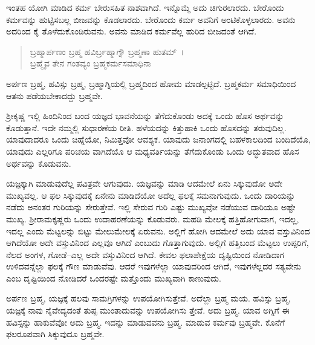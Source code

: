 ಇಂತಹ ಯೋಗಿ ಮಾಡಿದ ಕರ್ಮ ಬೇರುಸಹಿತ ನಾಶವಾಗಿದೆ. ಇನ್ನೊಮ್ಮೆ ಅದು ಚಿಗುರಲಾರದು. ಬೇರೊಂದು ಕರ್ಮವನ್ನು ಹುಟ್ಟಿಸಬಲ್ಲ ಬೀಜವನ್ನು ಕೊಡಲಾರದು. ಬೇರೊಂದು ಕರ್ಮ ಅವನಿಗೆ ಅಂಟಿಕೊಳ್ಳಲಾರದು. ಅವನು ಅದರಿಂದ ಕೈ ತೊಳೆದುಕೊಂಡಿರುವನು. ಅವನು ಮಾಡಿದ ಕರ್ಮವೆಲ್ಲ ಹುರಿದ ಬೀಜದಂತೆ ಆಗಿದೆ.

\begin{verse}
ಬ್ರಹ್ಮಾರ್ಪಣಂ ಬ್ರಹ್ಮ ಹವಿರ್ಬ್ರಹ್ಮಾಗ್ನೌ ಬ್ರಹ್ಮಣಾ ಹುತಮ್~।\\ಬ್ರಹ್ಮೈವ ತೇನ ಗಂತವ್ಯಂ ಬ್ರಹ್ಮಕರ್ಮಸಮಾಧಿನಾ 
\end{verse}

{\small ಅರ್ಪಣ ಬ್ರಹ್ಮ, ಹವಿಸ್ಸು ಬ್ರಹ್ಮ, ಬ್ರಹ್ಮಾಗ್ನಿಯಲ್ಲಿ ಬ್ರಹ್ಮದಿಂದ ಹೋಮ ಮಾಡಲ್ಪಟ್ಟಿದೆ. ಬ್ರಹ್ಮಕರ್ಮ ಸಮಾಧಿಯಿಂದ ಆತನು ಪಡೆಯಬೇಕಾದದ್ದು ಬ್ರಹ್ಮವೇ.}

ಶ‍್ರೀಕೃಷ್ಣ ಇಲ್ಲಿ ಹಿಂದಿನಿಂದ ಬಂದ ಯಜ್ಞದ ಭಾವನೆಯನ್ನು ತೆಗೆದುಕೊಂಡು ಅದಕ್ಕೆ ಒಂದು ಹೊಸ ಅರ್ಥವನ್ನು ಕೊಡುತ್ತಾನೆ. ಇದೇ ನಮ್ಮಲ್ಲಿ ಸುಧಾರಣೆಯ ರೀತಿ. ಹಳೆಯದನ್ನು ಕಿತ್ತುಹಾಕಿ ಒಂದು ಹೊಸದನ್ನು ತರುವುದಿಲ್ಲ. ಯಾವುದಾದರೂ ಒಂದು ಚಿಹ್ನೆಯೋ, ನಿಮಿತ್ತವೋ ಆವಶ್ಯಕ. ಯಾವುದು ಜನಾಂಗದಲ್ಲಿ ಬಹಳಕಾಲದಿಂದ ಬಂದಿದೆಯೊ, ಯಾವುದು ಎಲ್ಲರಿಗೂ ಪರಿಚಯ ವಾಗಿದೆಯೊ ಆ ಮಧ್ಯವರ್ತಿಯನ್ನು ತೆಗೆದುಕೊಂಡು ಒಂದು ಅದ್ಭುತವಾದ ಹೊಸ ಅರ್ಥವನ್ನು ಕೊಡುವನು.

ಯಜ್ಞಕ್ಕಾಗಿ ಮಾಡುವುದೆಲ್ಲ ಪವಿತ್ರವೇ ಆಗುವುದು. ಯಜ್ಞವನ್ನು ಮಾಡಿ ಆದಮೇಲೆ ಏನು ಸಿಕ್ಕುವುದೋ ಅದೇ ಮುಖ್ಯವಲ್ಲ. ಆ ಫಲ ಸಿಕ್ಕುವುದಕ್ಕೆ ಏನೇನು ಮಾಡಿದೆಯೋ ಅದೆಲ್ಲ ಫಲಕ್ಕೆ ಸಮನಾಗುವುದು. ಒಂದು ದಾರಿಯನ್ನು ನಡೆದು ಅನಂತರ ಗುರಿಯನ್ನು ಸೇರುತ್ತೇವೆ. ಇಲ್ಲಿ ಸೇರುವ ಗುರಿ ಎಷ್ಟು ಮುಖ್ಯವೋ ನಡೆಯುವ ದಾರಿಯೂ ಅಷ್ಟೇ ಮುಖ್ಯ. ಶ‍್ರೀರಾಮಕೃಷ್ಣರು ಒಂದು ಉದಾಹರಣೆಯನ್ನು ಕೊಡುವರು. ಮಹಡಿ ಮೇಲಕ್ಕೆ ಹತ್ತಿಹೋಗುವಾಗ, ಇದಲ್ಲ, ಇದಲ್ಲ ಎಂದು ಮೆಟ್ಟಲನ್ನು ಬಿಟ್ಟು ಮೇಲುಮೇಲಕ್ಕೆ ಏರುವನು. ಅಲ್ಲಿಗೆ ಹೋಗಿ ಆದಮೇಲೆ ಅದು ಯಾವ ವಸ್ತುವಿನಿಂದ ಆಗಿದೆಯೋ ಅದೇ ವಸ್ತುವಿನಿಂದ ಎಲ್ಲವೂ ಆಗಿದೆ ಎಂಬುದು ಗೊತ್ತಾಗುವುದು. ಅಲ್ಲಿಗೆ ಹತ್ತಿಬಂದ ಮೆಟ್ಟಲು ಉಪ್ಪರಿಗೆ, ನೆಲದ ಅಂಗಳ, ಗೋಡೆ–ಎಲ್ಲ ಅದೇ ವಸ್ತುವಿನಿಂದ ಆಗಿದೆ. ಕೇವಲ ಫಲಾಪೇಕ್ಷೆಯ ದೃಷ್ಟಿಯಿಂದ ನೋಡಿದಾಗ ಉಳಿದವನ್ನೆಲ್ಲಾ ಫಲಕ್ಕೆ ಗೌಣ ಮಾಡುವೆವು. ಆದರೆ ಇವುಗಳೆಲ್ಲಾ ಯಾವುದರಿಂದ ಆಗಿದೆ, ಇವುಗಳೆಲ್ಲದರ ಸತ್ಯವೇನು ಎಂಬ ದೃಷ್ಟಿಯಿಂದ ನೋಡಿದರೆ ಒಂದರಷ್ಟೇ ಮತ್ತೊಂದು ಮುಖ್ಯವಾಗಿ ಕಾಣುವುದು.

ಅರ್ಪಣ ಬ್ರಹ್ಮ, ಯಜ್ಞಕ್ಕೆ ಹಲವು ಸಾಮಗ್ರಿಗಳನ್ನು ಉಪಯೋಗಿಸುತ್ತೇವೆ. ಅದೆಲ್ಲಾ ಬ್ರಹ್ಮ ಮಯ. ಹವಿಸ್ಸು ಬ್ರಹ್ಮ, ಯಜ್ಞಕ್ಕೆ ನಾವು ನೈವೇದ್ಯದಂತೆ ತುಪ್ಪ ಮುಂತಾದುವನ್ನು ಉಪಯೋಗಿಸು ತ್ತೇವೆ. ಅದು ಬ್ರಹ್ಮ. ಯಾವ ಅಗ್ನಿಗೆ ಈ ಹವಿಸ್ಸನ್ನು ಹಾಕುವೆವೋ ಅದು ಬ್ರಹ್ಮ. ಇದನ್ನು ಮಾಡುವವನು ಬ್ರಹ್ಮ. ಮಾಡುವ ಕರ್ಮವು ಬ್ರಹ್ಮವೇ. ಕೊನೆಗೆ ಫಲರೂಪವಾಗಿ ಸಿಕ್ಕುವುದೂ ಬ್ರಹ್ಮವೇ.

